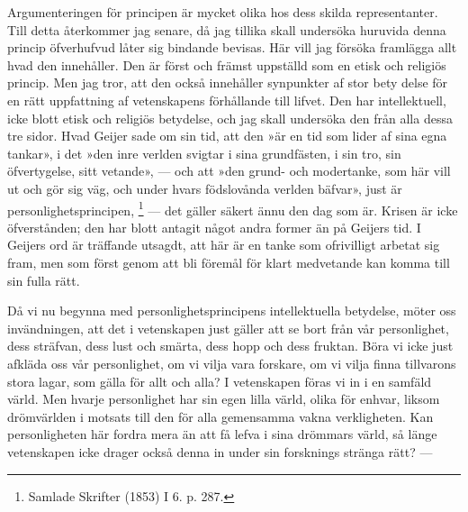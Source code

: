 \documentclass[12pt]{article}
\newcommand{\opage}[1]{\marginnote{\footnotesize\textit{[#1]}}}
\begin{document}
Argumenteringen för principen är mycket olika hos dess skilda representanter. Till detta återkommer jag senare, då jag tillika skall undersöka huruvida denna princip öfverhufvud låter sig bindande bevisas. Här vill jag försöka framlägga allt hvad den innehåller. Den är först och främst uppställd som en etisk och religiös princip. Men jag tror, att den också innehåller synpunkter af stor bety%
\opage{7}
delse för en rätt uppfattning af vetenskapens förhållande till lifvet. Den har intellektuell, icke blott etisk och religiös betydelse, och jag skall undersöka den från alla dessa tre sidor. Hvad Geijer sade om sin tid, att den »är en tid som lider af sina egna tankar», i det »den inre verlden svigtar i sina grundfästen, i sin tro, sin öfvertygelse, sitt vetande», --- och att »den grund- och modertanke, som här vill ut och gör sig väg, och under hvars födslovånda verlden bäfvar», just är personlighetsprincipen, %
\footnote[1]{Samlade Skrifter (1853) I 6. p. 287.} --- det gäller säkert ännu den dag som är. Krisen är icke öfverstånden; den har blott antagit något andra former än på Geijers tid. I Geijers ord är träffande utsagdt, att här är en tanke som ofrivilligt arbetat sig fram, men som först genom att bli föremål för klart medvetande kan komma till sin fulla rätt.

Då vi nu begynna med personlighetsprincipens intellektuella betydelse, möter oss invändningen, att det i vetenskapen %
\opage{8}
just gäller att se bort från vår personlighet, dess sträfvan, dess lust och smärta, dess hopp och dess fruktan. Böra vi icke just afkläda oss vår personlighet, om vi vilja vara forskare, om vi vilja finna tillvarons stora lagar, som gälla för allt och alla? I vetenskapen föras vi in i en samfäld värld. Men hvarje personlighet har sin egen lilla värld, olika för enhvar, liksom drömvärlden i motsats till den för alla gemensamma vakna verkligheten. Kan personligheten här fordra mera än att få lefva i sina drömmars värld, så länge vetenskapen icke drager också denna in under sin forsknings stränga rätt? ---
\end{document}
